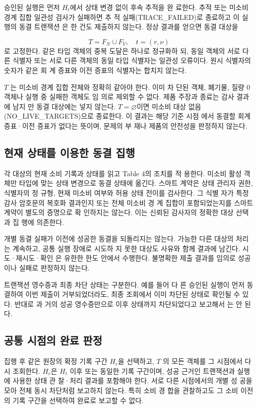 승인된 실행은 먼저 \(H_{t}\)에서 상태 변경 없이 후속 추적을 완
료한다. 추적 또는 미소비 경계 집합 일관성 검사가 실패하면 추
적 실패(TRACE\_FAILED)로 종료하고 이 실행의 동결 트랜잭션
은 한 건도 제출하지 않는다. 정상 결과를 얻으면 동결 대상을

\begin{equation}
    T=F_N\cup F_V,\quad t=(r,\nu)\tag{21}
\end{equation}
로 고정한다. 같은 타입 객체의 중복 도달은 하나로 정규화하
되, 동일 객체의 서로 다른 식별자 또는 서로 다른 객체의 동일
타입 식별자는 일관성 오류이다. 원시 식별자의 숫자가 같은 회
계 증표와 이전 증표의 식별자는 합치지 않는다.

\(T\) 는 미소비 경계 집합 전체와 정확히 같아야 한다. 이미 차
단된 객체, 폐기물, 질량 0 객체나 실행 중 실패한 객체도 임
의로 제외할 수 없다. 제품 주장과 종료는 감사 결과에 남지
만 동결 대상에는 넣지 않는다. \(T=\varnothing \)이면 미소비 대상 없음
(NO\_LIVE\_TARGETS)으로 종료한다. 이 결과는 해당 기준 시점
에서 동결할 회계 증표·이전 증표가 없다는 뜻이며, 문제의 부
재나 제품의 안전성을 판정하지 않는다.


\subsection{현재 상태를 이용한 동결 집행}
각 대상의 현재 소비 기록과 상태를 읽고 Table 4의 조치를 적
용한다. 미소비 활성 객체만 타입에 맞는 상태 변경으로 동결
상태에 옮긴다. 스마트 계약은 상태 관리자 권한, 식별자의 정
규형, 현재 미소비 여부와 허용 상태 전이를 검사한다. 그 식별
자가 특정 감사 암호문의 복호화 결과인지 또는 전체 미소비 경
계 집합이 포함되었는지를 스마트 계약이 별도의 증명으로 확
인하지는 않는다. 이는 신뢰된 감사자의 정확한 대상 선택과 집
행에 의존한다.

개별 동결 실패가 이전에 성공한 동결을 되돌리지는 않는다.
가능한 다른 대상의 처리는 계속하고, 공통 실행 장애로 시도하
지 못한 대상도 사유와 함께 결과에 남긴다. 시도·재시도·확인
은 유한한 한도 안에서 수행한다. 불명확한 제출 결과를 임의로
성공이나 실패로 판정하지 않는다.

트랜잭션 영수증과 최종 차단 상태는 구분한다. 예를 들어 다
른 승인된 실행이 먼저 동결하여 이번 제출이 거부되었더라도,
최종 조회에서 이미 차단된 상태로 확인될 수 있다. 반대로 과
거의 성공 영수증만으로 이후 상태까지 차단되었다고 보고해서
는 안 된다.

\subsection{공통 시점의 완료 판정}
집행 후 같은 원장의 확정 기록 구간 \(H_{r}\)을 선택하고, \(T\) 의 모든
객체를 그 시점에서 다시 조회한다. \(H_{r}\)은 \(H_{t}\) 이후 또는 동일한
기록 구간이며, 성공 근거인 트랜잭션과 실행에 사용한 상태 관
찰·처리 결과를 포함해야 한다. 서로 다른 시점에서의 개별 성
공을 모아 전체 동시 차단처럼 보고하지 않는다. 특히 소비 경
합을 관찰하고도 그 소비 이전의 기록 구간을 선택하여 완료로
보고할 수 없다.

